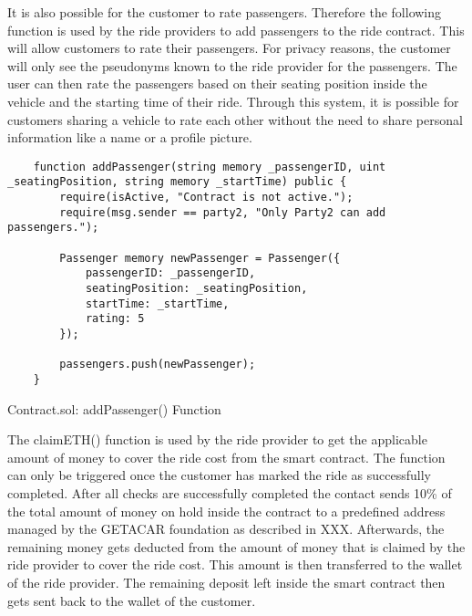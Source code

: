 It is also possible for the customer to rate passengers. Therefore the following function is used by the ride providers to add passengers to the ride contract. This will allow customers to rate their passengers. For privacy reasons, the customer will only see the pseudonyms known to the ride provider for the passengers. The user can then rate the passengers based on their seating position inside the vehicle and the starting time of their ride. Through this system, it is possible for customers sharing a vehicle to rate each other without the need to share personal information like a name or a profile picture. 

\lstset{
  basicstyle=\footnotesize\ttfamily,
  breaklines=true,
  numbers=left,
  firstnumber=53
}

\begin{Listing}
\begin{lstlisting}
    function addPassenger(string memory _passengerID, uint _seatingPosition, string memory _startTime) public {
        require(isActive, "Contract is not active.");
        require(msg.sender == party2, "Only Party2 can add passengers.");

        Passenger memory newPassenger = Passenger({
            passengerID: _passengerID,
            seatingPosition: _seatingPosition,
            startTime: _startTime,
            rating: 5
        });

        passengers.push(newPassenger);
    }
\end{lstlisting}
  \caption{Contract.sol: addPassenger() Function}
  \label{lst:setUserCanceldRide}
\end{Listing}


The claimETH() function is used by the ride provider to get the applicable amount of money to cover the ride cost from the smart contract. The function can only be triggered once the customer has marked the ride as successfully completed. After all checks are successfully completed the contact sends 10\% of the total amount of money on hold inside the contract to a predefined address managed by the GETACAR foundation as described in XXX. Afterwards, the remaining money gets deducted from the amount of money that is claimed by the ride provider to cover the ride cost. This amount is then transferred to the wallet of the ride provider. The remaining deposit left inside the smart contract then gets sent back to the wallet of the customer. 

\lstset{
  basicstyle=\footnotesize\ttfamily,
  breaklines=true,
  numbers=left,
  firstnumber=232
}

